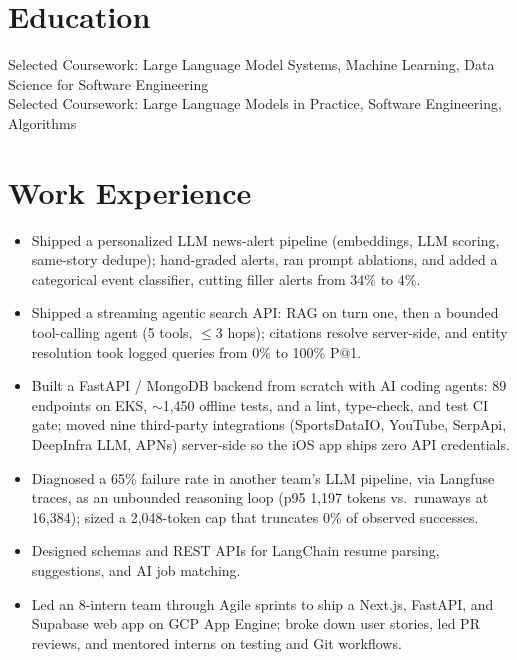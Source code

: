 \documentclass[11pt, letterpaper]{article}
\begin{document}

\section{Education}
Selected Coursework: Large Language Model Systems, Machine Learning, Data Science for Software Engineering\\[1pt]
Selected Coursework: Large Language Models in Practice, Software Engineering, Algorithms

\section{Work Experience}
\begin{itemize}
  \item Shipped a personalized LLM news-alert pipeline (embeddings, LLM scoring, same-story dedupe); hand-graded alerts, ran prompt ablations, and added a categorical event classifier, cutting filler alerts from 34\% to 4\%.
  \item Shipped a streaming agentic search API: RAG on turn one, then a bounded tool-calling agent (5 tools, $\le$3 hops); citations resolve server-side, and entity resolution took logged queries from 0\% to 100\% P@1.
  \item Built a FastAPI / MongoDB backend from scratch with AI coding agents: 89 endpoints on EKS, $\sim$1{,}450 offline tests, and a lint, type-check, and test CI gate; moved nine third-party integrations (SportsDataIO, YouTube, SerpApi, DeepInfra LLM, APNs) server-side so the iOS app ships zero API credentials.
  \item Diagnosed a 65\% failure rate in another team's LLM pipeline, via Langfuse traces, as an unbounded reasoning loop (p95 1{,}197 tokens vs.\ runaways at 16{,}384); sized a 2{,}048-token cap that truncates 0\% of observed successes.
\end{itemize}

\vspace{1pt}
\begin{itemize}
  \item Designed schemas and REST APIs for LangChain resume parsing, suggestions, and AI job matching.
  \item Led an 8-intern team through Agile sprints to ship a Next.js, FastAPI, and Supabase web app on GCP App Engine; broke down user stories, led PR reviews, and mentored interns on testing and Git workflows.
\end{itemize}
\end{document}
